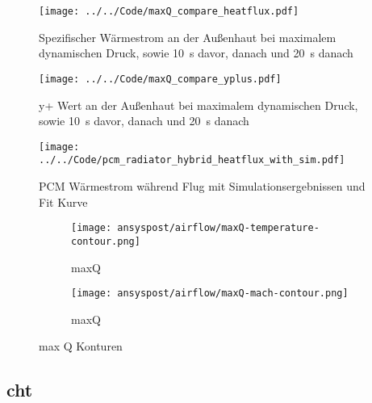 \begin{figure}[H]
  \centering
  \texttt{[image: ../../Code/maxQ\_compare\_heatflux.pdf]}
  \caption{Spezifischer Wärmestrom an der Außenhaut bei maximalem dynamischen Druck, sowie \SI{10}{s} davor, danach und \SI{20}{s} danach}\label{fig:spezifischer_waermestrom_maxQ_simulationen}
\end{figure}

\begin{figure}[H]
  \centering
  \texttt{[image: ../../Code/maxQ\_compare\_yplus.pdf]}
  \caption{y+ Wert an der Außenhaut bei maximalem dynamischen Druck, sowie \SI{10}{s} davor, danach und \SI{20}{s} danach}\label{fig:yplus_maxQ_simulationen}
\end{figure}

\begin{figure}[H]
  \centering
  \texttt{[image: ../../Code/pcm\_radiator\_hybrid\_heatflux\_with\_sim.pdf]}
  \caption{PCM Wärmestrom während Flug mit Simulationsergebnissen und Fit Kurve}\label{fig:pcm_waermestrom_sim}
\end{figure}

\begin{figure}[H]
    \centering

    \begin{subfigure}{\textwidth}
        \centering
        \texttt{[image: ansyspost/airflow/maxQ-temperature-contour.png]}
        \caption{maxQ}
        \label{fig:maxQ_temp_contour}
    \end{subfigure}

    \begin{subfigure}{\textwidth}
        \centering
        \texttt{[image: ansyspost/airflow/maxQ-mach-contour.png]}
        \caption{maxQ}
        \label{fig:maxQ_mach_contour}
    \end{subfigure}

    \caption{max Q Konturen}
    \label{fig:maxQ_konturen}
\end{figure}


\subsection{\texorpdfstring{\ac{cht}}{CHT}}

